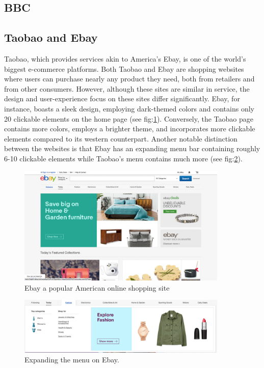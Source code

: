 \subsection{BBC}

\subsection{Taobao and Ebay}
Taobao, which provides services akin to America's Ebay, is one of the world's biggest e-commerce platforms. Both Taobao and Ebay are shopping websites where users can purchase nearly any product they need, both from retailers and from other consumers. However, although these sites are similar in service, the design and user-experience focus on these sites differ significantly. Ebay, for instance, boasts a sleek design, employing dark-themed colors and contains only 20 clickable elements on the home page (see fig:\ref{fig:ebay}). Conversely, the Taobao page contains more colors, employs a brighter theme, and incorporates more clickable elements compared to its western counterpart. Another notable distinction between the websites is that Ebay has an expanding menu bar containing roughly 6-10 clickable elements while Taobao's menu contains much more (see fig:\ref{fig:ebay_menu}).

\begin{figure}[h]
\centering
\includegraphics[width=100mm]{Images/ebay.png}
\decoRule
\caption[ebay]{Ebay a popular American online shopping site}
\label{fig:ebay}
\end{figure}

\begin{figure}[h]
\centering
\includegraphics[width=100mm]{Images/ebay_menu.png}
\decoRule
\caption[Ebay's menu bar]{Expanding the menu on Ebay.}
\label{fig:ebay_menu}
\end{figure}

